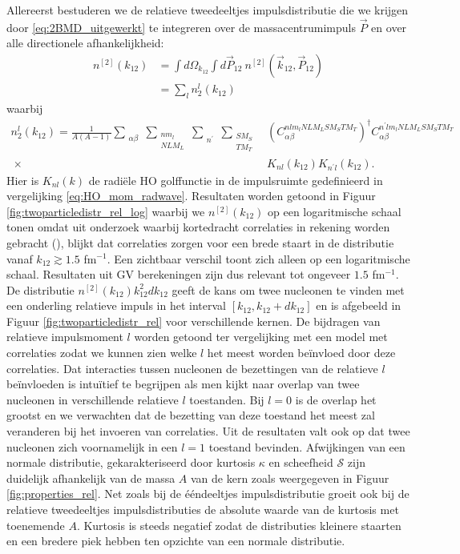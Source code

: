 \documentclass[11pt,twoside]{book}
\begin{document}
Allereerst bestuderen we de relatieve tweedeeltjes impulsdistributie die we krijgen door  \eqref{eq:2BMD_uitgewerkt} te integreren over de massacentrumimpuls $\vec{P}$ en over alle directionele afhankelijkheid:
\begin{align} \label{eq:rel_two}
n^{[2]}(k_{12}) & = \int d\Omega_{k_{12}}\int d\vec{P}_{12}\ n^{[2]}(\vec{k}_{12},\vec{P}_{12}) \nonumber \\
							& = \sum_{l} n_2^{l}(k_{12})
\end{align}
waarbij
\begin{align*}
n_2^{l}(k_{12}) = \frac{1}{A(A-1)} \sum_{\substack{\alpha \beta}} \sum_{\substack{nm_l \\ NLM_L}} \sum_{\substack{n^{\prime} }} \sum_{\substack{S M_S \\T M_T}} &  \left( C_{\alpha \beta}^{nlm_l NLM_L  S M_S T M_T} \right)^\dagger  C_{\alpha \beta}^{ n^{\prime} lm_l NLM_L  S M_S T M_T} \\ \ \times & K_{nl}(k_{12}) K_{n^{\prime} l}(k_{12}).
\end{align*}
Hier is $K_{nl}(k)$ de radi\"{e}le HO golffunctie in de impulsruimte gedefinieerd in vergelijking \eqref{eq:HO_mom_radwave}.
Resultaten worden getoond in Figuur \ref{fig:twoparticledistr_rel_log} waarbij we $n^{[2]}(k_{12})$ op een logaritmische schaal tonen omdat uit onderzoek waarbij kortedracht correlaties in rekening worden gebracht (\cite{maarten,wiringa2014nucleon}), blijkt dat correlaties zorgen voor een brede staart in de distributie vanaf $k_{12} \gtrsim 1.5$ fm$^{-1}$. Een zichtbaar verschil toont zich alleen op een logaritmische schaal.  Resultaten uit GV berekeningen zijn dus relevant tot ongeveer $1.5$ fm$^{-1}$. De distributie $n^{[2]}(k_{12})k_{12}^2dk_{12}$ geeft de kans om twee nucleonen te vinden met een onderling relatieve impuls in het interval $[ k_{12}, k_{12}+ d k_{12} ]$ en is afgebeeld in Figuur \ref{fig:twoparticledistr_rel} voor verschillende kernen. De bijdragen van relatieve impulsmoment $l$ worden getoond ter vergelijking met een model met correlaties zodat we kunnen zien welke $l$ het meest worden be\"{i}nvloed door deze correlaties. Dat interacties tussen nucleonen de bezettingen van de relatieve $l$ be\"{i}nvloeden is intu\"{i}tief te begrijpen als men kijkt naar overlap van twee nucleonen in verschillende relatieve $l$ toestanden. Bij $l=0$ is de overlap het grootst en we verwachten dat de bezetting van deze toestand het meest zal veranderen bij het invoeren van correlaties. Uit de resultaten valt ook op dat twee nucleonen zich voornamelijk in een $l=1$ toestand bevinden. Afwijkingen van een normale distributie, gekarakteriseerd door kurtosis $\kappa$ en scheefheid $\mathcal{S}$ zijn duidelijk afhankelijk van de massa $A$ van de kern zoals weergegeven in Figuur \ref{fig:properties_rel}. Net zoals bij de \'{e}\'{e}ndeeltjes impulsdistributie groeit ook bij de relatieve tweedeeltjes impulsdistributies de absolute waarde van de kurtosis met toenemende $A$. Kurtosis is steeds negatief zodat de distributies kleinere staarten en een bredere piek hebben ten opzichte van een normale distributie. 
\end{document}
